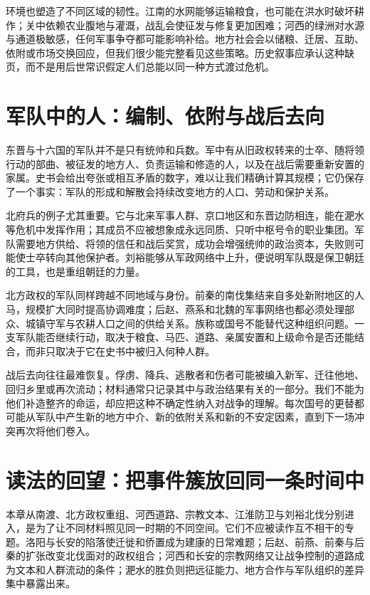 环境也塑造了不同区域的韧性。江南的水网能够运输粮食，也可能在洪水时破坏耕作；关中依赖农业腹地与灌溉，战乱会使征发与修复更加困难；河西的绿洲对水源与通道极敏感，任何军事争夺都可能影响补给。地方社会会以储粮、迁居、互助、依附或市场交换回应，但我们很少能完整看见这些策略。历史叙事应承认这种缺页，而不是用后世常识假定人们总能以同一种方式渡过危机。

\section{军队中的人：编制、依附与战后去向}
\label{sec:eastern-jin-depth-soldiers}

东晋与十六国的军队并不是只有统帅和兵数。军中有从旧政权转来的士卒、随将领行动的部曲、被征发的地方人、负责运输和修造的人，以及在战后需要重新安置的家属。史书会给出夸张或相互矛盾的数字，难以让我们精确计算其规模；它仍保存了一个事实：军队的形成和解散会持续改变地方的人口、劳动和保护关系。

北府兵的例子尤其重要。它与北来军事人群、京口地区和东晋边防相连，能在淝水等危机中发挥作用；其成员不应被想象成永远同质、只听中枢号令的职业集团。军队需要地方供给、将领的信任和战后奖赏，成功会增强统帅的政治资本，失败则可能使士卒转向其他保护者。刘裕能够从军政网络中上升，便说明军队既是保卫朝廷的工具，也是重组朝廷的力量。

北方政权的军队同样跨越不同地域与身份。前秦的南伐集结来自多处新附地区的人马，规模扩大同时提高协调难度；后赵、燕系和北魏的军事网络也都必须处理部众、城镇守军与农耕人口之间的供给关系。族称或国号不能替代这种组织问题。一支军队能否继续行动，取决于粮食、马匹、道路、亲属安置和上级命令是否还能结合，而非只取决于它在史书中被归入何种人群。

战后去向往往最难恢复。俘虏、降兵、逃散者和伤者可能被编入新军、迁往他地、回归乡里或再次流动；材料通常只记录其中与政治结果有关的一部分。我们不能为他们补造整齐的命运，却应把这种不确定性纳入对战争的理解。每次国号的更替都可能从军队中产生新的地方中介、新的依附关系和新的不安定因素，直到下一场冲突再次将他们卷入。

\section{读法的回望：把事件簇放回同一条时间中}
\label{sec:eastern-jin-depth-reading-return}

本章从南渡、北方政权重组、河西道路、宗教文本、江淮防卫与刘裕北伐分别进入，是为了让不同材料照见同一时期的不同空间。它们不应被读作互不相干的专题。洛阳与长安的陷落使迁徙和侨置成为建康的日常难题；后赵、前燕、前秦与后秦的扩张改变北伐面对的政权组合；河西和长安的宗教网络又让战争控制的道路成为文本和人群流动的条件；淝水的胜负则把远征能力、地方合作与军队组织的差异集中暴露出来。

